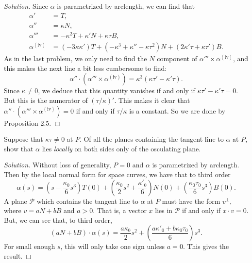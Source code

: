 \documentclass[Shifrin_Solutions_Spring_2015]{subfiles}
\begin{document}
\begin{proof}[Solution]
Since $\alpha$ is parametrized by arclength, we can find that
\begin{align*}
\alpha' & = T ,\\
\alpha'' & = \kappa N ,\\
\alpha''' & = -\kappa^2 T +  \kappa' N + \kappa\tau B , \\
\alpha^{\mathrm{(iv)}} & = (-3\kappa \kappa') T + (-\kappa^3 + \kappa''  - \kappa \tau^2 ) N + (2\kappa'\tau + \kappa \tau') B.
\end{align*}
As in the last problem, we only need to find the $N$ component of $\alpha'''\times \alpha^{\mathrm{(iv)}}$, and this makes the next line a bit less cumbersome to find:
\[
\alpha''\cdot (\alpha''' \times \alpha^{\mathrm{(iv)}} ) = \kappa^3 ( \kappa \tau' - \kappa' \tau ) .
\]
Since $\kappa \neq 0$, we deduce that this quantity vanishes if and only if $\kappa \tau' - \kappa' \tau = 0$. But this is the numerator of
$(\tau/\kappa)'$. This makes it clear that $\alpha''\cdot(\alpha'''\times\alpha^{(\mathrm{iv})}) = 0$ if and only if $\tau/\kappa$ is a constant. So we are done by Proposition 2.5.
\end{proof}

\vspace{.5cm}


\begin{exercise}
Suppose that $\kappa\tau \neq 0$ at $P$. Of all the planes containing the tangent line to $\alpha$ at $P$, show that $\alpha$ lies \emph{locally} on both sides only of the osculating plane.
\end{exercise}

\begin{proof}[Solution]
Without loss of generality, $P= 0$ and $\alpha$ is parametrized by arclength. Then by the local normal form for space curves, we have that to third order
\[
\alpha(s) = \left(s - \dfrac{\kappa_0}{6} s^3 \right) T(0) + \left( \dfrac{\kappa_0}{2}s^2 + \dfrac{\kappa'_0}{6} \right) N(0) + \left( \dfrac{\kappa_0\tau_0}{6} s^3 \right) B(0) .
\]
A plane $\mathcal{P}$ which contains the tangent line to $\alpha$ at $P$ must have the form $v^{\perp}$, where $v = a N + b B$ and $a>0$. That is, a vector $x$ lies in $\mathcal{P}$ if and only if $
x \cdot v = 0$. But, we can see that, to third order,
\[
(a N + b B ) \cdot \alpha(s) = \dfrac{a\kappa_0}{2} s^2 + \left( \dfrac{a\kappa'_0 + b\kappa_0 \tau_0}{6} \right) s^3 .
\]
For small enough $s$, this will only take one sign unless $a=0$. This gives the result.
\end{proof}
\end{document}
